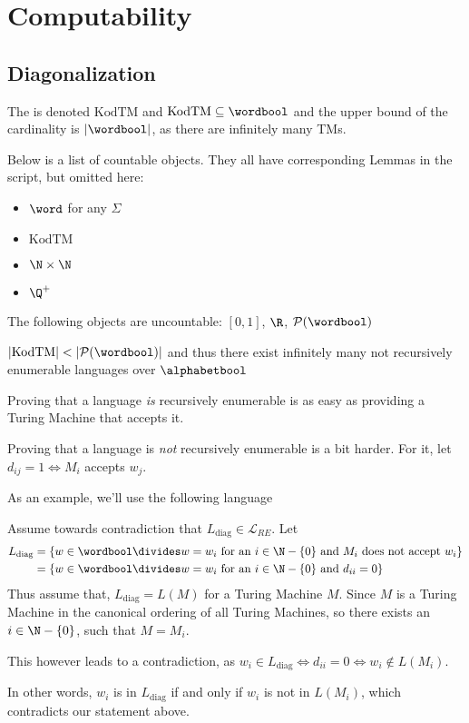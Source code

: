 \newsection
\section{Computability}
\subsection{Diagonalization}
The  is denoted $\text{KodTM}$ and $\text{KodTM} \subseteq \wordbool$ and the upper bound of the cardinality is $|\wordbool|$,
as there are infinitely many TMs.

Below is a list of countable objects. They all have corresponding Lemmas in the script, but omitted here:
\drmvspace
\begin{multicols}{4}
    \begin{itemize}
        \item $\word$ for any $\Sigma$
        \item $\text{KodTM}$
        \item $\N \times \N$
        \item $\Q^+$
    \end{itemize}
\end{multicols}

\rmvspace
\drmvspace
The following objects are uncountable: $[0, 1]$, $\R$, $\mathcal{P}(\wordbool)$

\inlinecorollary $|\text{KodTM}| < |\mathcal{P}(\wordbool)|$ and thus there exist infinitely many not recursively enumerable languages over $\alphabetbool$


Proving that a language \textit{is} recursively enumerable is as easy as providing a Turing Machine that accepts it.

Proving that a language is \textit{not} recursively enumerable is a bit harder. For it, let $d_{ij} = 1 \Longleftrightarrow M_i$ accepts $w_j$.

As an example, we'll use the following language

Assume towards contradiction that $L_\text{diag} \in \mathcal{L}_{RE}$. Let 
\begin{align*}
    L_{\text{diag}} & = \{ w \in \wordbool \divides w = w_i \text{ for an } i \in \N - \{ 0 \} \text{ and $M_i$ does not accept } w_i \} \\
                    & = \{ w \in \wordbool \divides w = w_i \text{ for an } i \in \N - \{ 0 \} \text{ and } d_{ii} = 0\}
\end{align*}
Thus assume that, $L_\text{diag} = L(M)$ for a Turing Machine $M$.
Since $M$ is a Turing Machine in the canonical ordering of all Turing Machines, so there exists an $i \in \N - \{ 0 \}$, such that $M = M_i$.

This however leads to a contradiction, as $w_i \in L_\text{diag} \Longleftrightarrow d_{ii} = 0 \Longleftrightarrow w_i \notin L(M_i)$.

In other words, $w_i$ is in $L_\text{diag}$ if and only if $w_i$ is not in $L(M_i)$, which contradicts our statement above.
